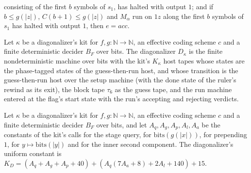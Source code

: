 \begin{theorem}
consisting of the first $b$ symbols of $s_1$, has halted with output $1$; and if $b \le g(|z|)$, $C(b + 1) \le g(|z|)$ and $M_\alpha$ run on $1z$ along the first $b$ symbols of $s_1$ has halted with output $1$, then $e = \mathit{acc}$.
\end{theorem}

\begin{definition}
\label{Turing.NTimeDiag.dzD}
\leanok
{}
Let $\kappa$ be a diagonalizer's kit for $f, g : \mathbb{N} \to \mathbb{N}$, an effective coding scheme $c$ and a finite deterministic decider $B_F$ over bits. The diagonalizer $D_\kappa$ is the finite nondeterministic machine over bits with the kit's $K_\kappa$ host tapes whose states are the phase-tagged states of the guess-then-run host, and whose transition is the guess-then-run host over the setup machine (with the done state of the ruler's rewind as its exit), the block tape $\tau_6$ as the guess tape, and the run machine entered at the flag's start state with the run's accepting and rejecting verdicts.
\end{definition}

\begin{definition}
\label{Turing.NTimeDiag.dzK}
\leanok
{}
Let $\kappa$ be a diagonalizer's kit for $f, g : \mathbb{N} \to \mathbb{N}$, an effective coding scheme $c$ and a finite deterministic decider $B_F$ over bits, and let $A_q, A_g, A_p, A_l, A_a$ be the constants of the kit's calls for the stage query, for $\mathrm{bits}(g(|x|))$, for prepending $1$, for $y \mapsto \mathrm{bits}(|y|)$ and for the inner second component. The diagonalizer's uniform constant is $K_D = (A_q + A_g + A_p + 40) + (A_q(7A_a + 8) + 2A_l + 140) + 15$.
\end{definition}

